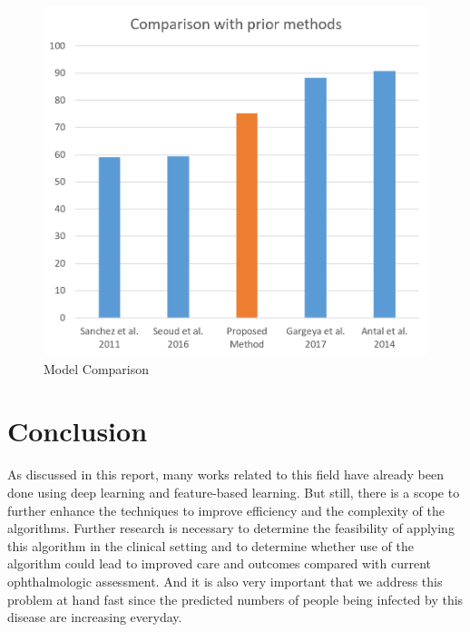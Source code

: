 \documentclass[12pt]{report}
\begin{document}
\begin{figure}[h]
	\centering
	\includegraphics[width=1\textwidth]{comp}
	\caption{Model Comparison}
	\label{fig:test10}
\end{figure}





\chapter{Conclusion}
As discussed in this report, many works related to this field have already been done using deep learning and feature-based learning. But still, there is a scope to further enhance the techniques to improve efficiency and the complexity of the algorithms. Further research is necessary to determine the feasibility of applying this algorithm in the clinical setting and to determine whether use of the algorithm could lead to improved care and outcomes compared with current ophthalmologic assessment. And it is also very important that we address this problem at hand fast since the predicted numbers of people being infected by this disease are increasing everyday.
\end{document}
